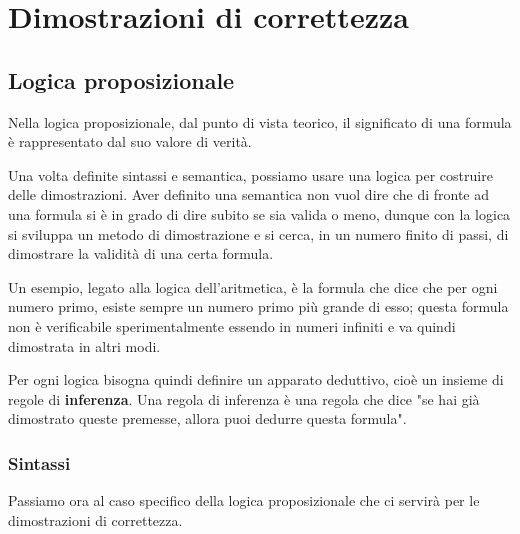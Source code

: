 \chapter{Dimostrazioni di correttezza}
\section{Logica proposizionale}
Nella logica proposizionale, dal punto di vista teorico, il significato di una
formula è rappresentato dal suo valore di verità.

Una volta definite sintassi e semantica, possiamo usare una logica per costruire
delle dimostrazioni. Aver definito una semantica non vuol dire che di fronte ad
una formula si è in grado di dire subito se sia valida o meno, dunque con la logica
si sviluppa un metodo di dimostrazione e si cerca, in un numero finito di passi,
di dimostrare la validità di una certa formula.

Un esempio, legato alla logica dell'aritmetica, è la formula che dice che per ogni
numero primo, esiste sempre un numero primo più grande di esso; questa formula
non è verificabile sperimentalmente essendo in numeri infiniti e va quindi
dimostrata in altri modi.

Per ogni logica bisogna quindi definire un apparato deduttivo, cioè un insieme di
regole di \textbf{inferenza}. Una regola di inferenza è una regola che dice "se
hai già dimostrato queste premesse, allora puoi dedurre questa formula".
\subsection{Sintassi}
Passiamo ora al caso specifico della logica proposizionale che ci servirà per le
dimostrazioni di correttezza.

